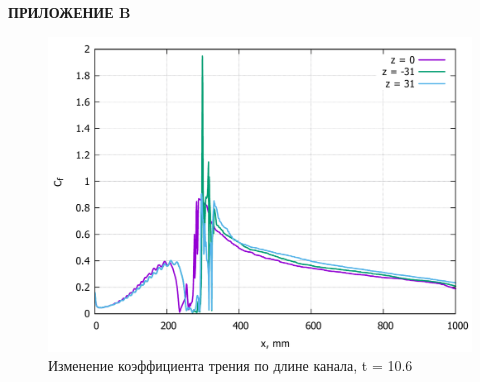 \newpage
\begin{flushright}
	\MakeUppercase{\textbf{Приложение B}}
\end{flushright}
\begin{figure}[H]
	\centering
	\includegraphics[width=0.8\linewidth]{../Assets/Cf-T1060-all}
	\caption{Изменение коэффициента трения по длине канала, t = 10.6}
	\label{fig:cf-t1060-all}
\end{figure}
